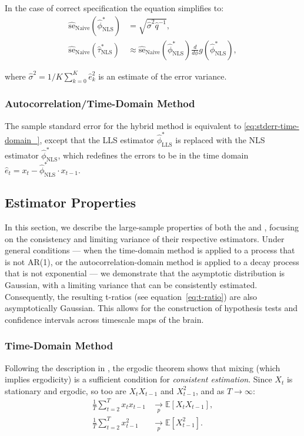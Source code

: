 \documentclass[docs/main.tex]{subfiles}
\begin{document}
\noindent In the case of correct specification the equation simplifies to:
\begin{align}
    \widehat{\text{se}}_\text{Naive}(\hat\phi^*_{\scriptscriptstyle\text{NLS}}) &= \sqrt{\hat\sigma^2 \hat q^{-1}},\\
    \widehat{\text{se}}_\text{Naive}(\hat\tau^*_{\scriptscriptstyle\text{NLS}}) &\approx \widehat{\text{se}}_{\text{Naive}}(\hat\phi^*_{\scriptscriptstyle\text{NLS}}) \frac{d}{d\phi} g(\hat\phi^*_{\scriptscriptstyle\text{NLS}}),
\end{align}

\noindent where $\hat\sigma^2 = 1/K \sum_{k=0}^K \hat e_k^2$ is an estimate of the error variance.\\

\subsubsection{Autocorrelation/Time-Domain Method}\label{sec:stderr-autocorrelation/time-domain_}
The sample standard error for the hybrid method is equivalent to \eqref{eq:stderr-time-domain_}, except that the LLS estimator $\hat\phi^*_{\scriptscriptstyle\text{LLS}}$ is replaced with the NLS estimator $\hat\phi^*_{\scriptscriptstyle\text{NLS}}$, which redefines the errors to be in the time domain $\hat e_t = x_t - \hat\phi^*_{\scriptscriptstyle\text{NLS}} \cdot x_{t-1}$.

\subsection{Estimator Properties}\label{sec:estimator-properties}
In this section, we describe the large-sample properties of both the  and , focusing on the consistency and limiting variance of their respective estimators. Under general conditions --- when the time-domain method is applied to a process that is not AR(1), or the autocorrelation-domain method is applied to a decay process that is not exponential --- we demonstrate that the asymptotic distribution is Gaussian, with a limiting variance that can be consistently estimated. Consequently, the resulting t-ratios (see equation~\eqref{eq:t-ratio}) are also asymptotically Gaussian. This allows for the construction of hypothesis tests and confidence intervals across timescale maps of the brain.

\subsubsection{Time-Domain Method}
Following the description in \citet[Theorem~14.29]{hansen_econometrics_2022}, the ergodic theorem shows that mixing (which implies ergodicity) is a sufficient condition for \textit{consistent estimation}. Since $X_t$ is stationary and ergodic, so too are $X_t X_{t-1}$ and $X_{t-1}^2$, and as $T \to \infty$:
\begin{align}
    \frac{1}{T} \sum_{t=2}^T x_t x_{t-1} &\underset{p}{\to} \mathbb{E}[X_t X_{t-1}],\\
    \frac{1}{T} \sum_{t=2}^T x_{t-1}^2 &\underset{p}{\to} \mathbb{E}[X_{t-1}^2].
\end{align}
\end{document}

